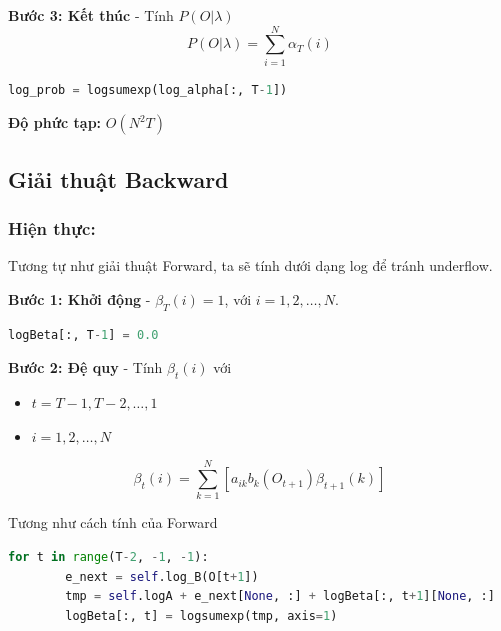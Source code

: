 \documentclass[twoside, final]{hcmut_report}
\begin{document}
\textbf{Bước 3: Kết thúc} - Tính $P(O|\lambda)$
\begin{equation}
P(O|\lambda) = \sum_{i=1}^{N} \alpha_T(i) \tag{2.4}
\end{equation}

\begin{tcolorbox}
\begin{lstlisting}[language=Python]
        log_prob = logsumexp(log_alpha[:, T-1])
\end{lstlisting}
\end{tcolorbox}

\textbf{Độ phức tạp:} $O(N^2T)$

\subsection{Giải thuật Backward}
\subsubsection*{Hiện thực:  }

Tương tự như giải thuật Forward, ta sẽ tính dưới dạng log để tránh underflow.

\textbf{Bước 1: Khởi động} - $\beta_T(i) = 1$, với $i = 1, 2, \ldots, N$.

\begin{tcolorbox}
\begin{lstlisting}[language=Python]
 logBeta[:, T-1] = 0.0
\end{lstlisting}
\end{tcolorbox}

\textbf{Bước 2: Đệ quy} - Tính $\beta_t(i)$ với
\begin{itemize}
    \item $t = T - 1, T - 2, \ldots, 1$
    \item $i = 1, 2, \ldots, N$
\end{itemize}

\begin{equation}
\beta_t(i) = \sum_{k=1}^{N} \left[a_{ik} b_k(O_{t+1}) \beta_{t+1}(k)\right]
\end{equation}

Tương như cách tính của Forward

\begin{tcolorbox}
\begin{lstlisting}[language=Python]
    for t in range(T-2, -1, -1):
        e_next = self.log_B(O[t+1])
        tmp = self.logA + e_next[None, :] + logBeta[:, t+1][None, :]
        logBeta[:, t] = logsumexp(tmp, axis=1)
\end{lstlisting}
\end{tcolorbox}
\end{document}
